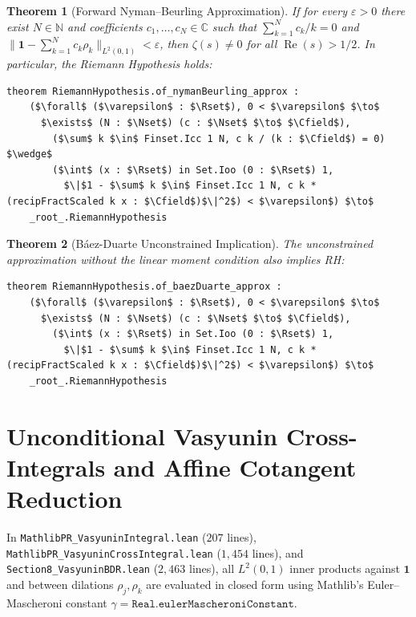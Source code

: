 \documentclass[11pt,a4paper]{article}
\newtheorem{theorem}{Theorem}[section]
\theoremstyle{definition}
\newcommand{\Nset}{\mathbb{N}}
\newcommand{\Rset}{\mathbb{R}}
\newcommand{\Cfield}{\mathbb{C}}
\begin{document}
\begin{theorem}[Forward Nyman--Beurling Approximation]\label{thm:forward_nb}
If for every $\varepsilon > 0$ there exist $N \in \Nset$ and coefficients $c_1, \dots, c_N \in \Cfield$ such that $\sum_{k=1}^N c_k / k = 0$ and $\|\mathbf{1} - \sum_{k=1}^N c_k \rho_k\|_{L^2(0, 1)} < \varepsilon$, then $\zeta(s) \neq 0$ for all $\operatorname{Re}(s) > 1/2$. In particular, the Riemann Hypothesis holds:
\begin{lstlisting}
theorem RiemannHypothesis.of_nymanBeurling_approx :
    ($\forall$ ($\varepsilon$ : $\Rset$), 0 < $\varepsilon$ $\to$
      $\exists$ (N : $\Nset$) (c : $\Nset$ $\to$ $\Cfield$),
        ($\sum$ k $\in$ Finset.Icc 1 N, c k / (k : $\Cfield$) = 0) $\wedge$
        ($\int$ (x : $\Rset$) in Set.Ioo (0 : $\Rset$) 1,
          $\|$1 - $\sum$ k $\in$ Finset.Icc 1 N, c k * (recipFractScaled k x : $\Cfield$)$\|^2$) < $\varepsilon$) $\to$
    _root_.RiemannHypothesis
\end{lstlisting}
\end{theorem}

\begin{theorem}[B\'aez-Duarte Unconstrained Implication]
The unconstrained approximation without the linear moment condition also implies RH:
\begin{lstlisting}
theorem RiemannHypothesis.of_baezDuarte_approx :
    ($\forall$ ($\varepsilon$ : $\Rset$), 0 < $\varepsilon$ $\to$
      $\exists$ (N : $\Nset$) (c : $\Nset$ $\to$ $\Cfield$),
        ($\int$ (x : $\Rset$) in Set.Ioo (0 : $\Rset$) 1,
          $\|$1 - $\sum$ k $\in$ Finset.Icc 1 N, c k * (recipFractScaled k x : $\Cfield$)$\|^2$) < $\varepsilon$) $\to$
    _root_.RiemannHypothesis
\end{lstlisting}
\end{theorem}

\section{Unconditional Vasyunin Cross-Integrals and Affine Cotangent Reduction}

In \texttt{MathlibPR\_\allowbreak VasyuninIntegral.lean} ($207$ lines), \texttt{MathlibPR\_\allowbreak VasyuninCrossIntegral.lean} ($1{,}454$ lines), and \texttt{Section8\_\allowbreak VasyuninBDR.lean} ($2{,}463$ lines), all $L^2(0, 1)$ inner products against $\mathbf{1}$ and between dilations $\rho_j, \rho_k$ are evaluated in closed form using Mathlib's Euler--Mascheroni constant $\gamma = \texttt{Real.eulerMascheroniConstant}$.
\end{document}

